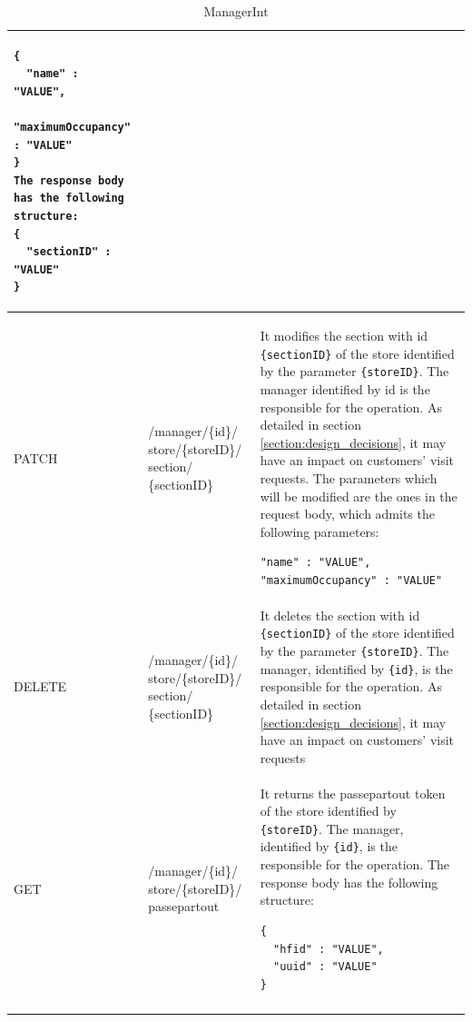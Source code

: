 \documentclass[a4paper,oneside,11pt]{book}
\begin{document}
\begin{longtable}[c] { |>{\centering\arraybackslash}P{0.11\textwidth}|>{\centering\arraybackslash\ttfamily}H{0.23\textwidth}|H{0.50\textwidth}| }
\begin{lstlisting}[language=jsonDD]
{
  "name" : "VALUE",
  "maximumOccupancy" : "VALUE"
}
The response body has the following structure:
{
  "sectionID" : "VALUE"
}
\end{lstlisting} \\ \hline
        PATCH & /manager/\{id\}/ store/\{storeID\}/ section/ \{sectionID\} & It modifies the section with id \texttt{\{sectionID\}} of the store identified by the parameter \texttt{\{storeID\}}. The manager identified by {id} is the responsible for the operation. As detailed in section \ref{section:design_decisions}, it may have an impact on customers’ visit requests. The parameters which will be modified are the ones in the request body, which admits the following parameters:
\begin{lstlisting}[language=jsonDD]
"name" : "VALUE",
"maximumOccupancy" : "VALUE"
\end{lstlisting} \\ \hline
        DELETE & /manager/\{id\}/ store/\{storeID\}/ section/ \{sectionID\} & It deletes the section with id \texttt{\{sectionID\}} of the store identified by the parameter \texttt{\{storeID\}}. The manager, identified by \texttt{\{id\}}, is the responsible for the operation. As detailed in section \ref{section:design_decisions}, it may have an impact on customers’ visit requests
        \\ \hline
        GET & /manager/\{id\}/ store/\{storeID\}/ passepartout & It returns the passepartout token of the store identified by \texttt{\{storeID\}}. The manager, identified by \texttt{\{id\}}, is the responsible for the operation. The response body has the following structure:
        \begin{lstlisting}[language=jsonDD]
{
  "hfid" : "VALUE",
  "uuid" : "VALUE"
}
        \end{lstlisting} \\ \hline
        \caption{ManagerInt}
        \label{table:manager_int}
    \end{longtable}
    
\end{document}
